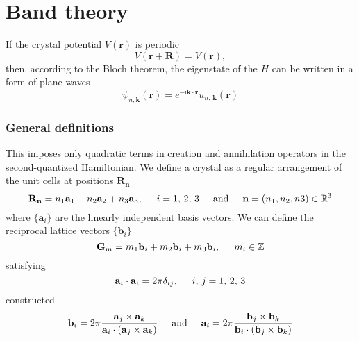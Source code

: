 \chapter{Band theory}
\label{ch:appendixA}

If the crystal potential $V( \mathbf{r})$ is periodic
\begin{equation}
V (\mathbf{r} + \mathbf{R})  = V ( \mathbf{r}),
\label{eq:periodic_pot}
\end{equation}
then, according to the Bloch theorem, the eigenstate of the $H$ can be written in a form of plane waves
\begin{equation}
\psi_{n, \mathbf{k}} (\mathbf{r}) = e^ { - \mathrm{i} \mathbf{k} \cdot \mathbf{r}} u_{n, \, \mathbf{k}} (\mathbf{r})  
\label{eq:bloch}
\end{equation}







\subsection{General definitions}
This imposes only quadratic terms in creation and annihilation operators in the second-quantized Hamiltonian. We define a crystal as a regular arrangement of the unit cells at positions $\mathbf{R_n}$
\begin{equation}
\mathbf{R_n} = n_1  \mathbf{a}_1 + n_2  \mathbf{a}_2 + n_3  \mathbf{a}_3, \hspace*{0.5cm}  i = 1, \, 2, \, 3 \hspace*{0.5cm}  \textnormal{and} \hspace*{0.5cm} \mathbf{n} = (n_1, n_2, n3)  \in \mathbb{R}^3
\end{equation}
where $\lbrace \mathbf{a}_i \rbrace$ are the linearly independent basis vectors. We can define the reciprocal lattice vectors $\lbrace \mathbf{b}_i \rbrace$
\begin{equation}
\mathbf{G}_m = m_1 \mathbf{b}_i + m_2 \mathbf{b}_i + m_3 \mathbf{b}_i, \hspace*{0.5cm} m_i \in \mathbb{Z}
\end{equation}
satisfying
\begin{equation}
\mathbf{a}_i \cdot \mathbf{a}_i = 2 \pi \delta_{ij}, \hspace*{0.5cm} i, \, j = 1, \, 2, \, 3
\end{equation}
constructed
\begin{equation}
\mathbf{b}_i  = 2 \pi \frac{\mathbf{a}_j  \times \mathbf{a}_k }{\mathbf{a}_i  \cdot \left(\mathbf{a}_j  \times \mathbf{a}_k  \right)} \hspace*{0.5cm} \textnormal{and} \hspace*{0.5cm} \mathbf{a}_i = 2 \pi \frac{\mathbf{b}_j  \times \mathbf{b}_k }{\mathbf{b}_i  \cdot \left( \mathbf{b}_j \times \mathbf{b}_k  \right)}
\end{equation}



